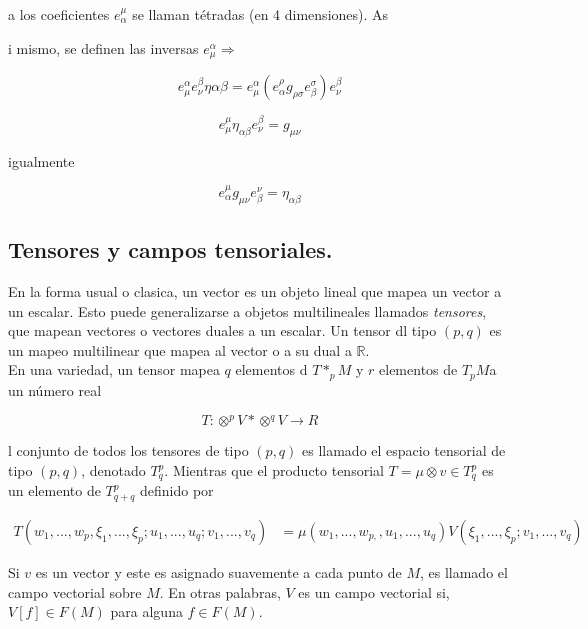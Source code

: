 \documentclass{report}
\begin{document}
a los coeficientes $e^{\mu}_{\alpha}$ se llaman tétradas (en 4 dimensiones). As{i mismo, se definen las inversas $e^{\alpha}_{\mu} \Rightarrow$

\[e_{\mu} ^{\alpha} e_{\nu}^{\beta} \eta {\alpha \beta} = e_{\mu}^{\alpha}(e_{\alpha}^{\rho} g_{\rho \sigma}e_{\beta}^{\sigma})e_{\nu}^{\beta}\]

\begin{equation}
e_{\mu}^{\mu}\eta_{\alpha \beta} e_{\nu}^{\beta} =g_{\mu \nu}
\end{equation}

igualmente

\begin{equation}
e_{\alpha}^{\mu} g_{\mu \nu}e_{\beta}^{\nu} = \eta _{\alpha \beta }
\end{equation}

\subsection{Tensores y campos tensoriales.}

En la forma usual o clasica, un vector es un objeto lineal que mapea un vector a un escalar. Esto puede generalizarse a objetos multilineales llamados \textit{tensores}, que mapean vectores o vectores duales a un escalar. Un tensor dl tipo $(p,q)$ es un mapeo multilinear que mapea al vector o a su dual a $\mathbb{R}$.\\

En una variedad, un tensor mapea $q$ elementos d $T*_{p}M$ y $r$ elementos de $T_{p}M$a un número real

\begin{equation}
T : \otimes^{p} V* \otimes^{q} V \rightarrow R
\end{equation}

l conjunto de todos los tensores de tipo $(p,q)$ es llamado el espacio tensorial de tipo $(p,q)$, denotado $T_{q} ^{p}$. Mientras que el producto tensorial $T = \mu \otimes v \in T_{q} ^{p}$ es un elemento de $T ^{p} _{q+q}$ definido por

\begin{equation}
\begin{split}
T(w_{1},...,w_{p}, \xi_{1},...,\xi _{p}; u_{1},...,u_{q};v_{1},...,v_{q}) 
& = \mu(w_{1},...,w_{p,}, u_{1},...,u_{q})V(\xi_{1},...,\xi_{p}; v_{1},...,v_{q})
\end{split}
\end{equation}


Si $v$ es un vector y este es asignado suavemente a cada punto de $M$, es llamado el campo vectorial sobre $M$. En otras palabras, $V$ es un campo vectorial si,$V[f] \in F(M)$ para alguna $f \in F(M)$.\\

}
\end{document}
